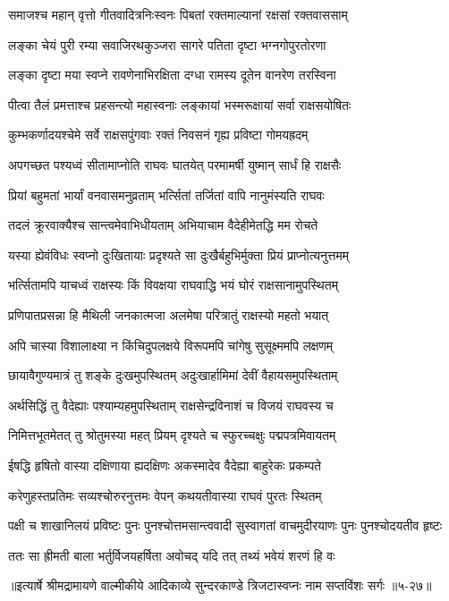 \twolineshloka
{समाजश्च महान् वृत्तो गीतवादित्रनिःस्वनः}
{पिबतां रक्तमाल्यानां रक्षसां रक्तवाससाम्} %

\twolineshloka
{लङ्का चेयं पुरी रम्या सवाजिरथकुञ्जरा}
{सागरे पतिता दृष्टा भग्नगोपुरतोरणा} %

\twolineshloka
{लङ्का दृष्टा मया स्वप्ने रावणेनाभिरक्षिता}
{दग्धा रामस्य दूतेन वानरेण तरस्विना} %

\twolineshloka
{पीत्वा तैलं प्रमत्ताश्च प्रहसन्त्यो महास्वनाः}
{लङ्कायां भस्मरूक्षायां सर्वा राक्षसयोषितः} %

\twolineshloka
{कुम्भकर्णादयश्चेमे सर्वे राक्षसपुंगवाः}
{रक्तं निवसनं गृह्य प्रविष्टा गोमयह्रदम्} %

\twolineshloka
{अपगच्छत पश्यध्वं सीतामाप्नोति राघवः}
{घातयेत् परमामर्षी युष्मान् सार्धं हि राक्षसैः} %

\twolineshloka
{प्रियां बहुमतां भार्यां वनवासमनुव्रताम्}
{भर्त्सितां तर्जितां वापि नानुमंस्यति राघवः} %

\twolineshloka
{तदलं क्रूरवाक्यैश्च सान्त्वमेवाभिधीयताम्}
{अभियाचाम वैदेहीमेतद्धि मम रोचते} %

\twolineshloka
{यस्या ह्येवंविधः स्वप्नो दुःखितायाः प्रदृश्यते}
{सा दुःखैर्बहुभिर्मुक्ता प्रियं प्राप्नोत्यनुत्तमम्} %

\twolineshloka
{भर्त्सितामपि याचध्वं राक्षस्यः किं विवक्षया}
{राघवाद्धि भयं घोरं राक्षसानामुपस्थितम्} %

\twolineshloka
{प्रणिपातप्रसन्ना हि मैथिली जनकात्मजा}
{अलमेषा परित्रातुं राक्षस्यो महतो भयात्} %

\twolineshloka
{अपि चास्या विशालाक्ष्या न किंचिदुपलक्षये}
{विरूपमपि चांगेषु सुसूक्ष्ममपि लक्षणम्} %

\twolineshloka
{छायावैगुण्यमात्रं तु शङ्के दुःखमुपस्थितम्}
{अदुःखार्हामिमां देवीं वैहायसमुपस्थिताम्} %

\twolineshloka
{अर्थसिद्धिं तु वैदेह्याः पश्याम्यहमुपस्थिताम्}
{राक्षसेन्द्रविनाशं च विजयं राघवस्य च} %

\twolineshloka
{निमित्तभूतमेतत् तु श्रोतुमस्या महत् प्रियम्}
{दृश्यते च स्फुरच्चक्षुः पद्मपत्रमिवायतम्} %

\twolineshloka
{ईषद्धि हृषितो वास्या दक्षिणाया ह्यदक्षिणः}
{अकस्मादेव वैदेह्या बाहुरेकः प्रकम्पते} %

\twolineshloka
{करेणुहस्तप्रतिमः सव्यश्चोरुरनुत्तमः}
{वेपन् कथयतीवास्या राघवं पुरतः स्थितम्} %

\twolineshloka
{पक्षी च शाखानिलयं प्रविष्टः पुनः पुनश्चोत्तमसान्त्ववादी}
{सुस्वागतां वाचमुदीरयाणः पुनः पुनश्चोदयतीव हृष्टः} %

\twolineshloka
{ततः सा ह्रीमती बाला भर्तुर्विजयहर्षिता}
{अवोचद् यदि तत् तथ्यं भवेयं शरणं हि वः} %


॥इत्यार्षे श्रीमद्रामायणे वाल्मीकीये आदिकाव्ये सुन्दरकाण्डे त्रिजटास्वप्नः नाम सप्तविंशः सर्गः ॥५-२७॥
